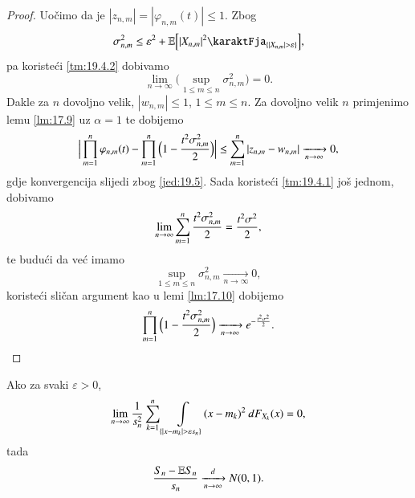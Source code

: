 \begin{proof}
    Uo\v cimo da je $|z_{n, m}| = |\varphi_{n, m} (t)| \leq 1$.
    Zbog
    \begin{equation*}
        \sigma_{n, m}^2 \leq \varepsilon^2 + \masE \Big[ |X_{n, m}|^2 \karaktFja_{\{ |X_{n, m}| > \varepsilon \}} \Big],    
    \end{equation*}
    pa koriste\' ci \ref{tm:19.4.2} dobivamo
    \begin{equation*}
        \lim\limits_{n \to \infty} \Big( \sup\limits_{1 \leq m \leq n} \sigma_{n, m}^2 \Big) = 0.
    \end{equation*}
    Dakle za $n$ dovoljno velik, $|w_{n, m}| \leq 1$, $1 \leq m \leq n$.
    Za dovoljno velik $n$ primjenimo lemu \ref{lm:17.9} uz $\alpha = 1$ te dobijemo
    \begin{equation*}
        \Big| \prod\limits_{m = 1}^{n} \varphi_{n, m} (t) - \prod\limits_{m = 1}^{n} \Big( 1 - \frac{t^2 \sigma_{n, m}^2}{2} \Big) \Big| \leq \sum\limits_{m = 1}^{n} |z_{n, m} - w_{n, m}| \xrightarrow[n \to \infty]{} 0,
    \end{equation*}
    gdje konvergencija slijedi zbog \eqref{jed:19.5}.
    Sada koriste\' ci \ref{tm:19.4.1} jo\v s jednom, dobivamo
    \begin{equation*}
        \lim\limits_{n \to \infty} \sum\limits_{m = 1}^{n} \frac{t^2 \sigma_{n, m}^2}{2} = \frac{t^2 \sigma^2}{2},
    \end{equation*}
    te budu\' ci da ve\' c imamo
    \begin{equation*}
        \sup\limits_{1 \leq m \leq n} \sigma_{n, m}^2 \xrightarrow[n \to \infty]{} 0,    
    \end{equation*}
    koriste\' ci sli\v can argument kao u lemi \ref{lm:17.10} dobijemo
    \begin{equation*}
        \prod\limits_{m = 1}^{n} \Big( 1 - \frac{t^2 \sigma_{n, m}^2}{2} \Big) \xrightarrow[n \to \infty]{} e^{- \frac{t^2 \sigma^2}{2}}.
    \end{equation*}
\end{proof}

\begin{kor}  \label{kor:19.6}
    \quad \newline
    Ako za svaki $\varepsilon > 0$,
    \begin{equation}    \label{jed:19.7}
        \lim\limits_{n \to \infty} \frac{1}{s_n^2} \sum\limits_{k = 1}^{n} \int\limits_{\{|x - m_k| > \varepsilon s_n\}} (x - m_k)^2 \: d F_{X_k} (x) = 0,
    \end{equation}
    tada
    \begin{equation*}
        \frac{S_n - \mathbb{E} S_n}{s_n} \xrightarrow[n \to \infty]{d} N(0,1).
    \end{equation*}
\end{kor}

